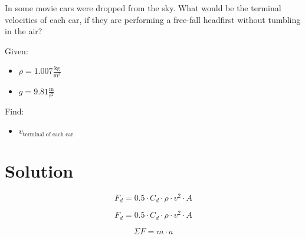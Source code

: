 
In some movie cars were dropped from the sky.
What would be the terminal velocities of each car, if they are
performing a free-fall headfirst without tumbling in the air?

\bigbreak Given:
\begin{itemize}
    \item $ \rho = 1.007 \frac{\text{kg}}{\text{m}^3} $
    \item $ g = 9.81 \frac{\text{m}}{\text{s}^2} $
\end{itemize}

Find:
\begin{itemize}
    \item $ v_{\text{terminal of each car}} $
\end{itemize}


\section*{Solution}

\begin{equation}
    \label{eq:newtons}
    F_d = 0.5 \cdot C_d \cdot \rho \cdot v^2 \cdot A
\end{equation}

\begin{equation}
    \label{eq:newtons}
    F_d = 0.5 \cdot C_d \cdot \rho \cdot v^2 \cdot A
\end{equation}


$$ \Sigma F = m \cdot a $$

